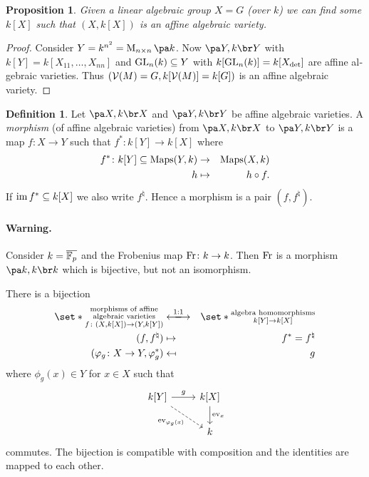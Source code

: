 \documentclass[12pt,a4paper]{scrartcl}
\theoremstyle{cplain}
\theoremstyle{cplain}
\theoremstyle{cplain}
\newtheorem{prop}[thmcounter]{Proposition}
\theoremstyle{definition}
\newtheorem*{deff}{Definition}
\begin{document}
\begin{otherlanguage}{english}
\begin{prop}
  Given a linear algebraic group $X = G$ (over $k$) we can find some $k[X]$ such that $(X,k[X])$ is an affine algebraic variety.
\end{prop}
\begin{proof}
  Consider $Y = k^{n^2} = \Mat nk$. Now $\aav Y$ with $k[Y] = k[X_{11},\ldots,X_{nn}]$ and $\operatorname{GL}_n(k) \subseteq Y$ with $k[\operatorname{GL}_n(k)] = k[X_{\det}]$ are affine algebraic varieties. Thus $(\mathcal{V}(M) = G, k[\mathcal{V}(M)] = k[G])$ is an affine algebraic variety.
\end{proof}

\begin{deff}
  Let $\aav X$ and $\aav Y$ be affine algebraic varieties. A \emph{morphism} (of affine algebraic varieties) from $\aav X$ to $\aav Y$ is a map $f\colon X \to Y$ such that $f^*\colon k[Y] \to k[X]$ where 
  \begin{eqnarray*}
    f^*\colon k[Y] \subseteq \operatorname{Maps}(Y,k) &\to& \operatorname{Maps}(X,k) \\
    h &\mapsto & h \circ f.
  \end{eqnarray*}
  If $\operatorname{im} f^* \subseteq k[X]$ we also write $f^\natural$. Hence a morphism is a pair $(f,f^\natural)$.
\end{deff}

\paragraph{Warning.} Consider $k =\overline{\mathbb F_p}$ and the Frobenius map $\operatorname{Fr}\colon k \to k$. Then $\operatorname{Fr}$ is a morphism $\aav k$ which is bijective, but not an isomorphism.


\begin{lem} \label{lem:VII.2}
  There is a bijection
  \begin{eqnarray*}
    \set*{\substack{\text{morphisms of affine}\\\text{algebraic varieties}\\ f\colon (X,k[X]) \to (Y,k[Y]) }} & \xlongleftrightarrow{1:1} & \set*{\substack{\text{algebra homomorphisms}\\ k[Y]\to k[X]}} \\
    (f,f^\natural) &\mapsto& f^* = f^\natural \\
    (\phi_g \colon X \to Y ,\phi_g^*) &\mapsfrom& g
  \end{eqnarray*}
  where $\phi_g(x) \in Y$ for $x \in X$ such that
  \[
    \begin{tikzcd}
      k[Y] \arrow[dashed]{dr}[swap]{\ev_{\phi_g(x)}}\arrow{r}{g} & k[X] \arrow{d}{\ev_x} \\
      & k
    \end{tikzcd}
  \]
  commutes. The bijection is compatible with composition and the identities are mapped to each other.
\end{lem}


\end{otherlanguage}
\end{document}
